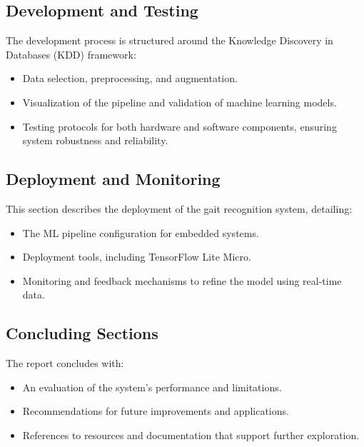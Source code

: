\subsection*{Development and Testing}
The development process is structured around the Knowledge Discovery in Databases (KDD) framework:
\begin{itemize}
    \item Data selection, preprocessing, and augmentation.
    \item Visualization of the pipeline and validation of machine learning models.
    \item Testing protocols for both hardware and software components, ensuring system robustness and reliability.
\end{itemize}

\subsection*{Deployment and Monitoring}
This section describes the deployment of the gait recognition system, detailing:
\begin{itemize}
    \item The ML pipeline configuration for embedded systems.
    \item Deployment tools, including TensorFlow Lite Micro.
    \item Monitoring and feedback mechanisms to refine the model using real-time data.
\end{itemize}

\subsection*{Concluding Sections}
The report concludes with:
\begin{itemize}
    \item An evaluation of the system's performance and limitations.
    \item Recommendations for future improvements and applications.
    \item References to resources and documentation that support further exploration.
\end{itemize}


\bigskip


